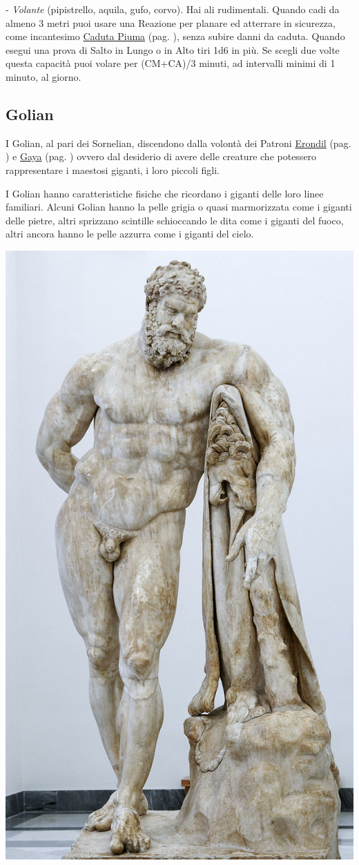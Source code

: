 \begin{multicols}{2}
- \emph{Volante} (pipistrello, aquila, gufo, corvo). Hai ali rudimentali. Quando cadi da almeno 3 metri puoi usare una Reazione per planare ed atterrare in sicurezza, come incantesimo \hyperlink{cadutapiuma}{Caduta Piuma} (pag. \pageref{cadutapiuma}), senza subire danni da caduta. Quando esegui una prova di Salto in Lungo o in Alto tiri 1d6 in più. Se scegli due volte questa capacità puoi volare per (CM+CA)/3 minuti, ad intervalli minimi di 1 minuto, al giorno.

\subsection{Golian}\label{golian}\hypertarget{golian}{}


I Golian, al pari dei Sornelian, discendono dalla volontà dei Patroni \hyperlink{erondil}{Erondil} (pag. \pageref{erondil}) e \hyperlink{gaya}{Gaya} (pag. \pageref{gaya}) ovvero dal desiderio di avere delle creature che potessero rappresentare i maestosi giganti, i loro piccoli figli.

I Golian hanno caratteristiche fisiche che ricordano i giganti delle loro linee familiari. Alcuni Golian hanno la pelle grigia o quasi marmorizzata come i giganti delle pietre, altri sprizzano scintille schioccando le dita come i giganti del fuoco, altri ancora hanno le pelle azzurra come i giganti del cielo.


\begin{center}
	\includegraphics[height=0.8\linewidth]{immagini/Herakles_Farnese_MAN_Napoli_Inv6001_n01.png}
	

\end{center}
\end{multicols}
